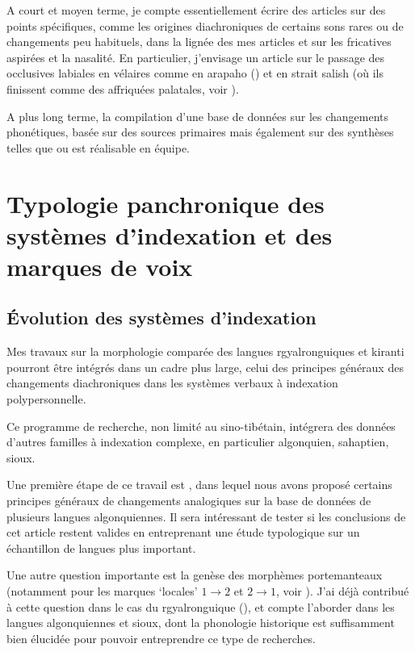 \documentclass[oldfontcommands,oneside,a4paper,11pt]{article}
\begin{document}
A court et moyen terme, je compte essentiellement écrire des articles sur des points spécifiques, comme les origines diachroniques de certains sons rares ou de changements peu habituels, dans la lignée des mes articles \citet{jacques11lingua} et \citet{michaud-jacques12nasalite} sur les fricatives aspirées et la nasalité. En particulier, j'envisage un article sur le passage des occlusives labiales en vélaires comme en arapaho (\citealt{goddard74arapaho}) et en strait salish (où ils finissent comme des affriquées palatales, voir \citealt[10-11]{kuipers02salish}).

A plus long terme, la compilation d'une base de données sur les changements phonétiques, basée sur des sources primaires mais également sur des synthèses telles que  \citet{kuemmel07wandel} ou \citet{blevins04evolutionary, blevins08naturalness} est réalisable en équipe.

 

\section{Typologie panchronique des systèmes d'indexation et des marques de voix }
 
\subsection{Évolution des systèmes d'indexation} \label{sec:indexation}
 Mes travaux sur la morphologie comparée des langues rgyalronguiques et kiranti pourront être intégrés dans un cadre plus large, celui des principes généraux des changements diachroniques dans les systèmes verbaux à indexation polypersonnelle.  
 
 Ce programme de recherche, non limité au sino-tibétain, intégrera des données d'autres familles à indexation complexe, en particulier algonquien, sahaptien, sioux. 

Une première étape de ce travail est \citet{jacques15directionality}, dans lequel nous avons proposé certains principes généraux de changements analogiques sur la base de données de plusieurs langues algonquiennes. Il sera intéressant de tester si les conclusions de cet article restent valides en entreprenant une étude typologique sur un échantillon de langues plus important.
 
 Une autre question importante est la genèse des morphèmes portemanteaux  (notamment pour les marques `locales' $1\rightarrow2$ et $2\rightarrow1$, voir \citealt{heath98skewing}). J'ai déjà contribué à cette question dans le cas du rgyalronguique (\citealt{jacques15generic}), et compte l'aborder dans les langues algonquiennes et sioux, dont la phonologie historique est suffisamment bien élucidée pour pouvoir entreprendre ce type de recherches. 
 
\end{document}
